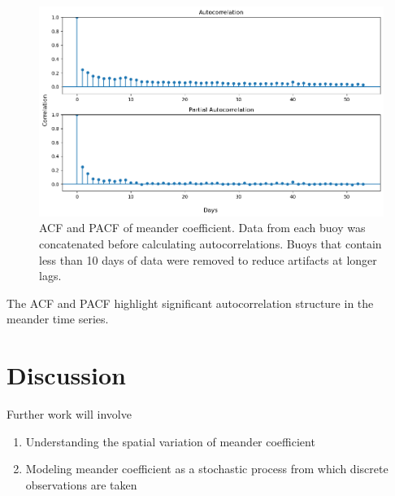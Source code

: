 \documentclass[12pt]{article}
\newcommand{\be}{\begin{enumerate}}
\newcommand{\ee}{\end{enumerate}}
\begin{document}
\begin{figure}[H]
    \centering
    \includegraphics[width=\textwidth]{../graphs/autocorrelation.png}
    \caption{\small ACF and PACF of meander coefficient. Data from each buoy
    was concatenated before calculating autocorrelations. Buoys that contain less
    than 10 days of data were removed to reduce artifacts at longer lags.}
\end{figure}

\noindent
The ACF and PACF highlight significant autocorrelation structure in the 
meander time series.

\section{Discussion}

Further work will involve 
\be
\item Understanding the spatial variation of meander coefficient
\item Modeling meander coefficient as a stochastic process from which discrete observations are taken
\ee



\end{document}
